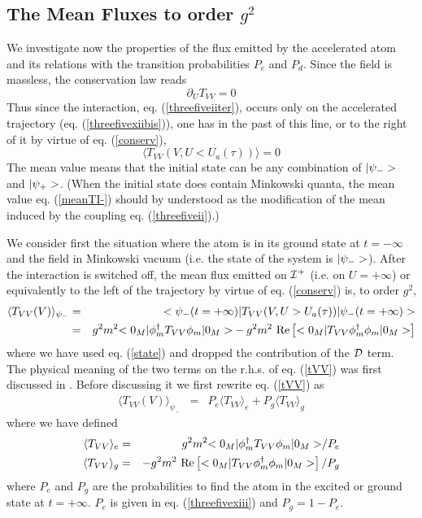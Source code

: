 \subsection{The Mean Fluxes to order $g^2$}

We investigate now the properties of the flux emitted by the accelerated atom
and its relations with the transition probabilities $P_e$ and $P_d$.
Since the field is massless, the conservation law reads
\begin{equation}
\partial_U T_{VV} =0
\label{conserv}
\end{equation}
Thus since the interaction, eq. (\ref{threefiveiiter}),
 occurs only on the accelerated trajectory (eq. (\ref{threefivexiibis})),
 one has in the past of this line,
 or to the right of it by virtue of eq. (\ref{conserv}),
\begin{equation}
\langle T_{VV}(V, U<U_a(\tau)) \rangle =0
\label{meanTI-}
\end{equation}
The mean value means that the initial state can be any combination
of $\mbox{$ \vert \psi_- > $}$ and $\mbox{$ \vert \psi_+ > $}$. (When the initial state does contain
Minkowski quanta, the mean value
eq. (\ref{meanTI-}) should by understood as the modification of the
mean induced by the coupling eq. (\ref{threefiveii}).)

 We consider first the situation where
the atom is in its ground state at $t=-\infty$ and the field
in Minkowski vacuum (i.e. the state of the
system is $\mbox{$ \vert \psi_- > $}$). After the interaction is switched off,
the mean flux emitted on ${\cal{I}}^+$
(i.e. on $U= + \infty$) or equivalently to
the
left of the trajectory by virtue of eq. (\ref{conserv})
 is, to order $g^2$,
\begin{eqnarray}
\langle T_{VV}(V) \rangle_{\psi_-} &=&
\mbox{$ < \psi_-(t=+\infty) \vert $} T_{VV}(V, U>U_a(\tau)) \mbox{$ \vert \psi_-(t=+\infty) > $}
\nonumber\\
&=&
g^2m^2 \mbox{$ < 0_M \vert $} \phi_m^\dagger T_{VV} \phi_m \mbox{$ \vert 0_M > $}
-  g^2m^2\mbox{ Re}\left[
 \mbox{$ < 0_M \vert $}  T_{VV} \phi_m^\dagger \phi_m \mbox{$ \vert 0_M > $} \right]
\label{tVV}
\end{eqnarray}
where we have used eq. (\ref{state}) and dropped the contribution of the
$\cal{D}
$ term.
The physical meaning of the two terms on the r.h.s. of eq. (\ref{tVV})
was first discussed in \cite{UnWa}.
Before discussing it we first
rewrite
eq. (\ref{tVV}) as
\begin{eqnarray}
\langle T_{VV}(V) \rangle_{\psi_-} &=&
P_e \langle T_{VV} \rangle _{e}
+  P_g \langle T_{VV} \rangle _{g}
\label{tVVB}
\end{eqnarray}
where we
have defined
\begin{eqnarray}
\langle T_{VV}\rangle _{e}
 &=& g^2m^2 \mbox{$ < 0_M \vert $} \phi_m^\dagger T_{VV} \phi_m
\mbox{$ \vert 0_M > $}/ P_e\nonumber\\
\langle T_{VV}\rangle _{g}
&=& - g^2m^2\mbox{ Re}\left[
 \mbox{$ < 0_M \vert $}  T_{VV} \phi_m^\dagger \phi_m \mbox{$ \vert 0_M > $} \right]/ P_g
\label{45b}
\end{eqnarray}
where $P_e$ and $P_g$ are the probabilities to find the atom
in the excited
or ground state at $t=+\infty$.  $P_e$ is given in eq. (\ref{threefivexiii})
and $P_g
=1-P_e$.

